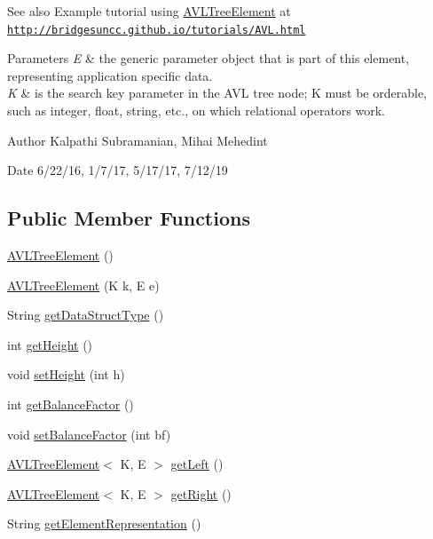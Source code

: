 \begin{DoxySeeAlso}{See also}
Example tutorial using \hyperlink{classbridges_1_1base_1_1_a_v_l_tree_element}{A\+V\+L\+Tree\+Element} at \href{http://bridgesuncc.github.io/tutorials/AVL.html}{\tt http\+://bridgesuncc.\+github.\+io/tutorials/\+A\+V\+L.\+html}
\end{DoxySeeAlso}

\begin{DoxyParams}{Parameters}
{\em E} & the generic parameter object that is part of this element, representing application specific data. \\
\hline
{\em K} & is the search key parameter in the A\+VL tree node; K must be orderable, such as integer, float, string, etc., on which relational operators work.\\
\hline
\end{DoxyParams}
\begin{DoxyAuthor}{Author}
Kalpathi Subramanian, Mihai Mehedint
\end{DoxyAuthor}
\begin{DoxyDate}{Date}
6/22/16, 1/7/17, 5/17/17, 7/12/19 
\end{DoxyDate}
\subsection*{Public Member Functions}
\begin{DoxyCompactItemize}
\item 
\hyperlink{classbridges_1_1base_1_1_a_v_l_tree_element_a8fe4490d3d5d16991736bd1a7243b904}{A\+V\+L\+Tree\+Element} ()
\item 
\hyperlink{classbridges_1_1base_1_1_a_v_l_tree_element_a060ec94b52675313ad15388e3f292df5}{A\+V\+L\+Tree\+Element} (K k, E e)
\item 
String \hyperlink{classbridges_1_1base_1_1_a_v_l_tree_element_abdd9e63de10732ef46bd5d531bd7f9d8}{get\+Data\+Struct\+Type} ()
\item 
int \hyperlink{classbridges_1_1base_1_1_a_v_l_tree_element_a52fe2886334c841547d238db69022697}{get\+Height} ()
\item 
void \hyperlink{classbridges_1_1base_1_1_a_v_l_tree_element_ac42b744989ed7e18dcbd52980e674b33}{set\+Height} (int h)
\item 
int \hyperlink{classbridges_1_1base_1_1_a_v_l_tree_element_a0478ca0351cd714e8f7b8e49703990c8}{get\+Balance\+Factor} ()
\item 
void \hyperlink{classbridges_1_1base_1_1_a_v_l_tree_element_a0dc3c83e750cc39535afb08ea92f6c98}{set\+Balance\+Factor} (int bf)
\item 
\hyperlink{classbridges_1_1base_1_1_a_v_l_tree_element}{A\+V\+L\+Tree\+Element}$<$ K, E $>$ \hyperlink{classbridges_1_1base_1_1_a_v_l_tree_element_a86f1329b19d2886ba7bf713e3844ecd6}{get\+Left} ()
\item 
\hyperlink{classbridges_1_1base_1_1_a_v_l_tree_element}{A\+V\+L\+Tree\+Element}$<$ K, E $>$ \hyperlink{classbridges_1_1base_1_1_a_v_l_tree_element_aab93418ac19605f2c7c57aa38d110921}{get\+Right} ()
\item 
String \hyperlink{classbridges_1_1base_1_1_a_v_l_tree_element_af7ab86f2421864daa4fdc2e84939f4ce}{get\+Element\+Representation} ()
\end{DoxyCompactItemize}

